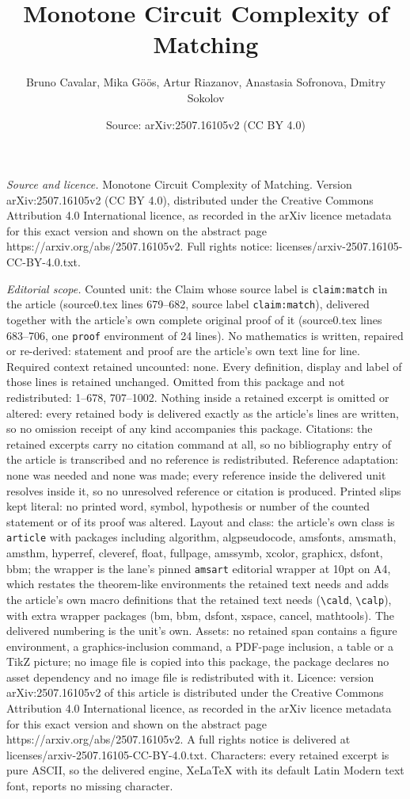 \documentclass[10pt,a4paper]{amsart}
\title[Monotone Circuit Complexity of Matching]{Monotone Circuit Complexity of Matching}
\author{Bruno Cavalar, Mika G\"o\"os, Artur Riazanov, Anastasia Sofronova, Dmitry Sokolov}
\date{Source: arXiv:2507.16105v2 (CC BY 4.0)}
\begin{document}
\maketitle

\noindent\emph{Source and licence.} Monotone Circuit Complexity of Matching. Version arXiv:2507.16105v2 (CC BY 4.0), distributed under the Creative Commons Attribution 4.0 International licence, as recorded in the arXiv licence metadata for this exact version and shown on the abstract page https://arxiv.org/abs/2507.16105v2. Full rights notice: licenses/arxiv-2507.16105-CC-BY-4.0.txt.\par\smallskip

\noindent\textit{Editorial scope.} Counted unit: the Claim whose source label is \texttt{claim:match} in the article (source0.tex lines 679--682, source label \texttt{claim:match}), delivered together with the article's own complete original proof of it (source0.tex lines 683--706, one \texttt{proof} environment of 24 lines). No mathematics is written, repaired or re-derived: statement and proof are the article's own text line for line. Required context retained uncounted: none. Every definition, display and label of those lines is retained unchanged. Omitted from this package and not redistributed: 1--678, 707--1002. Nothing inside a retained excerpt is omitted or altered: every retained body is delivered exactly as the article's lines are written, so no omission receipt of any kind accompanies this package. Citations: the retained excerpts carry no citation command at all, so no bibliography entry of the article is transcribed and no reference is redistributed. Reference adaptation: none was needed and none was made; every reference inside the delivered unit resolves inside it, so no unresolved reference or citation is produced. Printed slips kept literal: no printed word, symbol, hypothesis or number of the counted statement or of its proof was altered. Layout and class: the article's own class is \texttt{article} with packages including algorithm, algpseudocode, amsfonts, amsmath, amsthm, hyperref, cleveref, float, fullpage, amssymb, xcolor, graphicx, dsfont, bbm; the wrapper is the lane's pinned \texttt{amsart} editorial wrapper at 10pt on A4, which restates the theorem-like environments the retained text needs and adds the article's own macro definitions that the retained text needs (\texttt{\textbackslash cald}, \texttt{\textbackslash calp}), with extra wrapper packages (bm, bbm, dsfont, xspace, cancel, mathtools). The delivered numbering is the unit's own. Assets: no retained span contains a figure environment, a graphics-inclusion command, a PDF-page inclusion, a table or a TikZ picture; no image file is copied into this package, the package declares no asset dependency and no image file is redistributed with it. Licence: version arXiv:2507.16105v2 of this article is distributed under the Creative Commons Attribution 4.0 International licence, as recorded in the arXiv licence metadata for this exact version and shown on the abstract page https://arxiv.org/abs/2507.16105v2. A full rights notice is delivered at licenses/arxiv-2507.16105-CC-BY-4.0.txt. Characters: every retained excerpt is pure ASCII, so the delivered engine, XeLaTeX with its default Latin Modern text font, reports no missing character.
\end{document}
